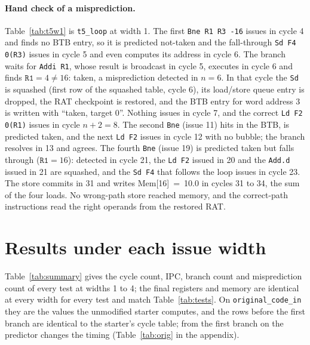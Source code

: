 \documentclass[11pt]{article}
\newcommand{\code}[1]{\texttt{#1}}
\newcommand{\cycletable}[1]{{\scriptsize\setlength{\tabcolsep}{2.5pt}}}
\begin{document}
\paragraph{Hand check of a misprediction.} Table~\ref{tab:t5w1} is \code{t5\_loop} at
width 1. The first \code{Bne R1 R3 -16} issues in cycle 4 and finds no BTB entry, so it is
predicted not-taken and the fall-through \code{Sd F4 0(R3)} issues in cycle 5 and even
computes its address in cycle 6. The branch waits for \code{Addi R1}, whose result is
broadcast in cycle 5, executes in cycle 6 and finds $\code{R1}=4\neq16$: taken, a
misprediction detected in $n=6$. In that cycle the \code{Sd} is squashed (first row of the
squashed table, cycle 6), its load/store queue entry is dropped, the RAT checkpoint is
restored, and the BTB entry for word address 3 is written with ``taken, target 0''. Nothing
issues in cycle 7, and the correct \code{Ld F2 0(R1)} issues in cycle $n+2=8$. The second
\code{Bne} (issue 11) hits in the BTB, is predicted taken, and the next \code{Ld F2} issues
in cycle 12 with no bubble; the branch resolves in 13 and agrees. The fourth \code{Bne}
(issue 19) is predicted taken but falls through ($\code{R1}=16$): detected in cycle 21, the
\code{Ld F2} issued in 20 and the \code{Add.d} issued in 21 are squashed, and the
\code{Sd F4} that follows the loop issues in cycle 23. The store commits in 31 and writes
Mem[16]~=~10.0 in cycles 31 to 34, the sum of the four loads. No wrong-path store reached
memory, and the correct-path instructions read the right operands from the restored RAT.

\begin{table}[htbp]
\centering
\begin{minipage}[t]{0.49\textwidth}
\centering
\caption{\code{t1\_independent}, width 4: 14 cycles.}
\label{tab:t1w4}
\cycletable{t1_independent.w4}
\end{minipage}\hfill
\begin{minipage}[t]{0.49\textwidth}
\centering
\caption{\code{t5\_loop}, width 1: 34 cycles, two mispredictions.}
\label{tab:t5w1}
\cycletable{t5_loop.w1}
\end{minipage}
\end{table}

\section{Results under each issue width}
\label{sec:results}

Table~\ref{tab:summary} gives the cycle count, IPC, branch count and misprediction count of
every test at widths 1 to 4; the final registers and memory are identical at every width
for every test and match Table~\ref{tab:tests}. On \code{original\_code\_in} they are the
values the unmodified starter computes, and the rows before the first branch are identical
to the starter's cycle table; from the first branch on the predictor changes the timing
(Table~\ref{tab:orig} in the appendix).
\end{document}
